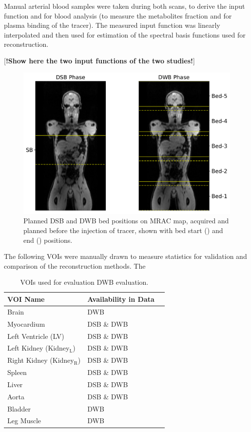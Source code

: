 Manual arterial blood samples were taken during both scans, to derive the input function and for blood analysis (to measure the metabolites fraction and for plasma binding of the tracer). The measured input function was linearly interpolated and then used for estimation of the spectral basis functions used for reconstruction. 

[\textbf{!Show here the two input functions of the two studies!}]

\begin{figure} [h!]
\centering
\includegraphics[scale=0.42,angle=0]{3_Results/3_3_DWB_Reconstruction/figures/3_3_IsotoPK_CTRL_PositionsOnMR.pdf}
\caption{Planned DSB and DWB bed positions on MRAC map, acquired and planned before the injection of tracer, shown with bed start (\protect{}) and end (\protect{}) positions.} 
\label{fig_3_3:IsotoPK_BedPositionsOnMR}
\end{figure} 

The following VOIs were manually drawn to measure statistics for validation and comparison of the reconstruction methods.
The 
\begin{table}[]
\centering
\caption{\label{tab:IsotoPK_VOIs} VOIs used for evaluation DWB evaluation.}
\begin{tabular}{lll}
\toprule
\textbf{VOI Name} & \textbf{Availability in Data}  \\
\midrule
Brain        & DWB                 \\
Myocardium & DSB \& DWB              \\
Left Ventricle (LV) & DSB \& DWB     \\
Left Kidney (Kidney$_\mathrm{L}$) & DSB \& DWB  \\
Right Kidney (Kidney$_\mathrm{R}$) & DSB \& DWB \\
Spleen & DSB \& DWB \\
Liver  & DSB \& DWB \\
Aorta & DSB \& DWB \\
Bladder & DWB \\
Leg Muscle & DWB \\
\toprule
\end{tabular}
\end{table}

